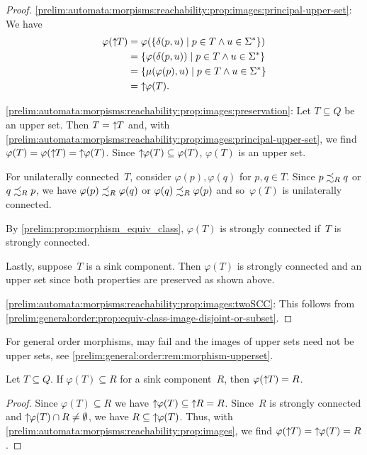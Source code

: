 \begin{proof}
\ref{prelim:automata:morpisms:reachability:prop:images:principal-upper-set}: 
We have
\begin{align*}
	\varphi(\mbox{\ensuremath{\displaystyle \uparrow \!\!T}}) 
	& = \varphi(\{ \delta(p, u) \mid p \in T \land u \in \Sigma^* \}) \\
	& = \{ \varphi(\delta(p, u)) \mid p \in T \land u \in \Sigma^* \} \\
	& = \{ \mu(\varphi(p), u) \mid p \in T \land u \in \Sigma^* \} \\
	& = \mbox{\ensuremath{\displaystyle \uparrow \!\!\varphi(T)}}.
\end{align*}

\ref{prelim:automata:morpisms:reachability:prop:images:preservation}: Let $T \subseteq Q$ be an upper set. 
Then $T = \mbox{\ensuremath{\displaystyle \uparrow \!\!T}}$
and, with \cref{prelim:automata:morpisms:reachability:prop:images:principal-upper-set}, we find 
$\varphi(T) = \varphi(\mbox{\ensuremath{\displaystyle \uparrow \!\!T}}) = \mbox{\ensuremath{\displaystyle \uparrow \!\!\varphi(T)}}$.
Since $\mbox{\ensuremath{\displaystyle \uparrow \!\!\varphi(T)}} \subseteq \varphi(T)$, $\varphi(T)$ is an upper set.

For unilaterally connected~$T$, consider $\varphi(p), \varphi(q)$ for $p,q \in T$.
Since $p \precsim_R q$ or $q \precsim_R p$, we have $\varphi(p) \precsim_R \varphi(q)$
or $\varphi(q) \precsim_R \varphi(p)$ and so~$\varphi(T)$
is unilaterally connected.

By \cref{prelim:prop:morphism_equiv_class}, $\varphi(T)$ is strongly connected
if~$T$ is strongly connected.

Lastly, suppose~$T$ is a sink component.
Then $\varphi(T)$ is strongly connected and an upper set
since both properties are preserved as shown above.

\ref{prelim:automata:morpisms:reachability:prop:images:twoSCC}: 
This follows from \cref{prelim:general:order:prop:equiv-class-image-disjoint-or-subset}.
\end{proof}

For general order morphisms,  may fail and 
the images of upper sets need not be upper sets, see \cref{prelim:general:order:rem:morphism-upperset}.

\begin{corollary} \label{prelim:automata:morpisms:reachability:cor:images}
	Let $T \subseteq Q$.
	If $\varphi(T) \subseteq R$ for a sink component~$R$,
	then $\varphi(\mbox{\ensuremath{\displaystyle \uparrow \!\!T}}) = R$.
\end{corollary}
\begin{proof}
	Since $\varphi(T) \subseteq R$
	we have $\mbox{\ensuremath{\displaystyle \uparrow \!\!\varphi(T)}} \subseteq \mbox{\ensuremath{\displaystyle \uparrow \!\!R}} = R$.
	Since~$R$ is strongly connected and $\mbox{\ensuremath{\displaystyle \uparrow \!\!\varphi(T)}} \cap R \ne \emptyset$,
	we have $R \subseteq \mbox{\ensuremath{\displaystyle \uparrow \!\!\varphi(T)}}$.
	Thus, with \cref{prelim:automata:morpisms:reachability:prop:images},
	we find $\varphi(\mbox{\ensuremath{\displaystyle \uparrow \!\!T}}) = \mbox{\ensuremath{\displaystyle \uparrow \!\!\varphi(T)}} = R$.
\end{proof}


